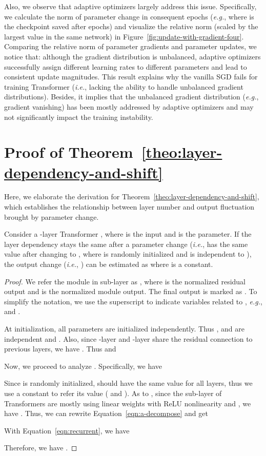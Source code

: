 \documentclass[11pt,a4paper]{article}
\newcommand{\eg}{\textit{e.g.}}
\newcommand{\ie}{\textit{i.e.}}
\begin{document}
Also, we observe that adaptive optimizers largely address this issue. 
Specifically, we calculate the norm of parameter change in consequent epochs (\eg,  where  is the checkpoint saved after  epochs) and visualize the relative norm (scaled by the largest value in the same network) in Figure~\ref{fig:update-with-gradient-four}.  
Comparing the relative norm of parameter gradients and parameter updates, we notice that: although the gradient distribution is unbalanced, adaptive optimizers successfully assign different learning rates to different parameters and lead to consistent update magnitudes. 
This result explains why the vanilla SGD fails for training Transformer (\ie, lacking the ability to handle unbalanced gradient distributions). 
Besides, it implies that the unbalanced gradient distribution (\eg, gradient vanishing) has been mostly addressed by adaptive optimizers and may not significantly impact the training instability. 

\section{Proof of Theorem~\ref{theo:layer-dependency-and-shift}}
\label{appendix:theo2}

Here, we elaborate the derivation for Theorem~\ref{theo:layer-dependency-and-shift}, which establishes the relationship between layer number and output fluctuation brought by parameter change. 

\begin{theorem}
Consider a -layer Transformer , where  is the input and  is the parameter. 
If the layer dependency stays the same after a parameter change 
(\ie,  has the same value after changing  to , where  is randomly initialized and  is independent to ), the output change (\ie, ) can be estimated as  where  is a constant.
\end{theorem}

\begin{proof}

We refer the module in  sub-layer as , where  is the normalized residual output and  is the normalized module output. 
The final output is marked as .
To simplify the notation, we use the superscript  to indicate variables related to , \eg,  and .

At initialization, all parameters are initialized independently.
Thus ,  and  are independent and . 
Also, since -layer and -layer share the residual connection to previous layers,  we have .
Thus  and 


Now, we proceed to analyze . Specifically, we have

Since  is randomly initialized,  should have the same value for all layers, thus we use a constant  to refer its value ( and ). 
As to , since the sub-layer of Transformers are mostly using linear weights with ReLU nonlinearity and , we have . 
Thus, we can rewrite Equation~\ref{eqn:a-decompose} and get  

With Equation~\ref{eqn:recurrent}, we have

Therefore, we have .
\end{proof}
\end{document}
